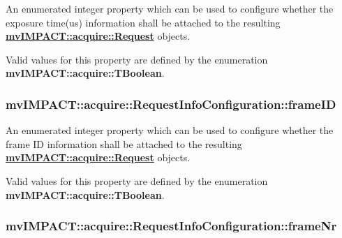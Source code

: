 An enumerated integer property which can be used to configure whether the exposure time(us) information shall be attached to the resulting {\bfseries \hyperlink{classmv_i_m_p_a_c_t_1_1acquire_1_1_request}{mv\+I\+M\+P\+A\+C\+T\+::acquire\+::\+Request}} objects. 

Valid values for this property are defined by the enumeration {\bfseries mv\+I\+M\+P\+A\+C\+T\+::acquire\+::\+T\+Boolean}. \hypertarget{classmv_i_m_p_a_c_t_1_1acquire_1_1_request_info_configuration_a9812a8596071f94151cf537b8f130c47}{
\subsubsection[{frame\+I\+D}]{ mv\+I\+M\+P\+A\+C\+T\+::acquire\+::\+Request\+Info\+Configuration\+::frame\+I\+D}}\label{classmv_i_m_p_a_c_t_1_1acquire_1_1_request_info_configuration_a9812a8596071f94151cf537b8f130c47}


An enumerated integer property which can be used to configure whether the frame I\+D information shall be attached to the resulting {\bfseries \hyperlink{classmv_i_m_p_a_c_t_1_1acquire_1_1_request}{mv\+I\+M\+P\+A\+C\+T\+::acquire\+::\+Request}} objects. 

Valid values for this property are defined by the enumeration {\bfseries mv\+I\+M\+P\+A\+C\+T\+::acquire\+::\+T\+Boolean}. \hypertarget{classmv_i_m_p_a_c_t_1_1acquire_1_1_request_info_configuration_af09762397b7527006125da34612a33a3}{
\subsubsection[{frame\+Nr}]{ mv\+I\+M\+P\+A\+C\+T\+::acquire\+::\+Request\+Info\+Configuration\+::frame\+Nr}}\label{classmv_i_m_p_a_c_t_1_1acquire_1_1_request_info_configuration_af09762397b7527006125da34612a33a3}


